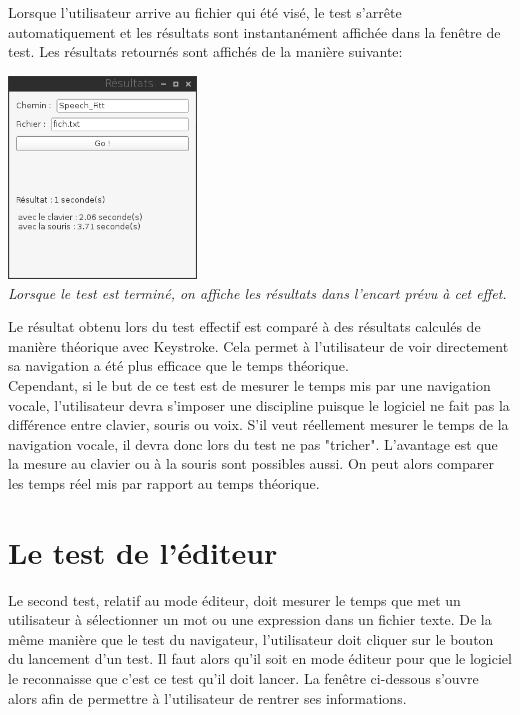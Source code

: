 \documentclass[a4paper, 11pt]{report}
\begin{document}
		Lorsque l'utilisateur arrive au fichier qui été visé, le test s'arrête automatiquement et les résultats sont instantanément affichée dans la fenêtre de test. Les résultats retournés sont affichés de la manière suivante:\\
		\begin{center}
			\includegraphics[width=5cm]{test_finished}\\
			\emph{Lorsque le test est terminé, on affiche les résultats dans l'encart prévu à cet effet.\\}
		\end{center}
		
		Le résultat obtenu lors du test effectif est comparé à des résultats calculés de manière théorique avec Keystroke. Cela permet à l'utilisateur de voir directement sa navigation a été plus efficace que le temps théorique.\\
	Cependant, si le but de ce test est de mesurer le temps mis par une navigation vocale, l'utilisateur devra s'imposer une discipline puisque le logiciel ne fait pas la différence entre clavier, souris ou voix. S'il veut réellement mesurer le temps de la navigation vocale, il devra donc lors du test ne pas "tricher". L'avantage est que la mesure au clavier ou à la souris sont possibles aussi. On peut alors comparer les temps réel mis par rapport au temps théorique.
	
	
		\section{Le test de l'éditeur}
		
		Le second test, relatif au mode éditeur, doit mesurer le temps que met un utilisateur à sélectionner un mot ou une expression dans un fichier texte. De la même manière que le test du navigateur, l'utilisateur doit cliquer sur le bouton du lancement d'un test. Il faut alors qu'il soit en mode éditeur pour que le logiciel le reconnaisse que c'est ce test qu'il doit lancer. La fenêtre ci-dessous s'ouvre alors afin de permettre à l'utilisateur de rentrer ses informations.\\
		
\end{document}
